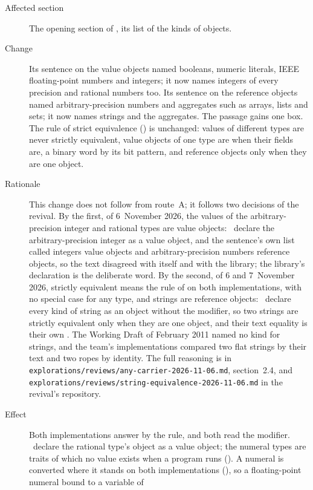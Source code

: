 \begin{description}
\item[Affected section] The opening section of , its list of
the kinds of objects.
\item[Change] Its sentence on the value objects named booleans, numeric
literals, IEEE floating-point numbers and integers; it now names integers of
every precision and rational numbers too.
Its sentence on the reference objects named arbitrary-precision numbers and
aggregates such as arrays, lists and sets; it now names strings and the
aggregates.
The passage gains one box.
The rule of strict equivalence () is unchanged: values of
different types are never strictly equivalent, value objects of one type are
when their fields are, a binary word by its bit pattern, and reference objects
only when they are one object.
\item[Rationale] This change does not follow from route~A; it follows two
decisions of the revival.
By the first, of 6~November 2026, the values of the arbitrary-precision integer
and rational types are value objects: \library\ declare the arbitrary-precision
integer as a value object, and the sentence's own list called integers value
objects and arbitrary-precision numbers reference objects, so the text
disagreed with itself and with the library; the library's declaration is the
deliberate word.
By the second, of 6 and 7~November 2026, strictly equivalent means the rule of
 on both implementations, with no special case for any type,
and strings are reference objects: \library\ declare every kind of string as an
object without the  modifier, so two strings are strictly equivalent
only when they are one object, and their text equality is their own \EXP{=}.
The Working Draft of February 2011 named no kind for strings, and the
team's implementations compared two flat strings by their text and two ropes
by identity.
The full reasoning is in
\nolinkurl{explorations/reviews/any-carrier-2026-11-06.md}, section~2.4, and
\nolinkurl{explorations/reviews/string-equivalence-2026-11-06.md} in the
revival's repository.
\item[Effect] Both implementations answer \EXP{\sequiv} by the rule, and both
read the  modifier.
\Library\ declare the rational type's object as a value object; the numeral
types are traits of which no value exists when a program runs
().
A numeral is converted where it stands on both implementations
(), so a floating-point numeral bound to a variable of

\end{description}
